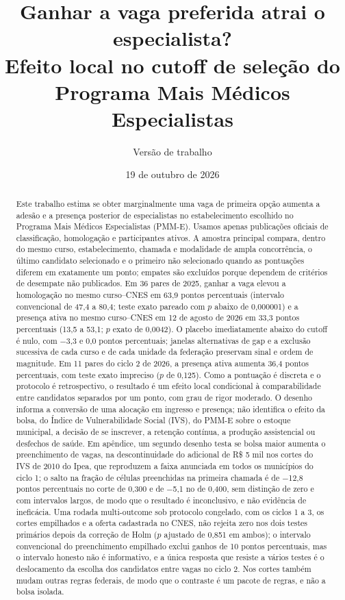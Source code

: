 \documentclass[11pt,a4paper]{article}
\title{Ganhar a vaga preferida atrai o especialista?\\
Efeito local no cutoff de seleção do Programa Mais Médicos Especialistas}
\author{Versão de trabalho}
\date{19 de outubro de 2026}
\begin{document}
\maketitle

\begin{abstract}
Este trabalho estima se obter marginalmente uma vaga de primeira opção aumenta
a adesão e a presença posterior de especialistas no estabelecimento escolhido
no Programa Mais Médicos Especialistas (PMM-E). Usamos apenas publicações
oficiais de classificação, homologação e participantes ativos. A amostra
principal compara, dentro do mesmo curso, estabelecimento, chamada e modalidade
de ampla concorrência, o último candidato selecionado e o primeiro não
selecionado quando as pontuações diferem em exatamente um ponto; empates são
excluídos porque dependem de critérios de desempate não publicados. Em 36 pares
de 2025, ganhar a vaga elevou a homologação no mesmo curso--CNES em 63,9 pontos
percentuais (intervalo convencional de 47,4 a 80,4; teste exato pareado com $p$
abaixo de 0,000001) e a presença ativa no mesmo curso--CNES em 12 de agosto de
2026 em 33,3 pontos percentuais (13,5 a 53,1; $p$ exato de 0,0042). O placebo
imediatamente abaixo do cutoff é nulo, com $-$3,3 e 0,0 pontos percentuais;
janelas alternativas de gap e a exclusão sucessiva de cada curso e de cada
unidade da federação preservam sinal e ordem de magnitude. Em 11 pares do ciclo
2 de 2026, a presença ativa aumenta 36,4 pontos percentuais, com teste exato
impreciso ($p$ de 0,125). Como a pontuação é discreta e o protocolo é
retrospectivo, o resultado é um efeito local condicional à comparabilidade entre
candidatos separados por um ponto, com grau de rigor moderado. O desenho informa
a conversão de uma alocação em ingresso e presença; não identifica o efeito da
bolsa, do Índice de Vulnerabilidade Social (IVS), do PMM-E sobre o estoque
municipal, a decisão de se inscrever, a retenção contínua, a produção
assistencial ou desfechos de saúde. Em apêndice, um segundo desenho testa se
bolsa maior aumenta o preenchimento de vagas, na descontinuidade do adicional
de R\$ 5 mil nos cortes do IVS de 2010 do Ipea, que reproduzem a faixa
anunciada em todos os municípios do ciclo 1; o salto na fração de células
preenchidas na primeira chamada é de $-$12,8 pontos percentuais no corte de
0,300 e de $-$5,1 no de 0,400, sem distinção de zero e com intervalos largos,
de modo que o resultado é inconclusivo, e não evidência de ineficácia. Uma
rodada multi-outcome sob protocolo congelado, com os ciclos 1 a 3, os cortes
empilhados e a oferta cadastrada no CNES, não rejeita zero nos dois testes
primários depois da correção de Holm ($p$ ajustado de 0,851 em ambos); o
intervalo convencional do preenchimento empilhado exclui ganhos de 10 pontos
percentuais, mas o intervalo honesto não é informativo, e a única resposta que
resiste a vários testes é o deslocamento da escolha dos candidatos entre vagas
no ciclo 2. Nos cortes também mudam outras regras federais, de modo que o
contraste é um pacote de regras, e não a bolsa isolada.
\end{abstract}
\end{document}
